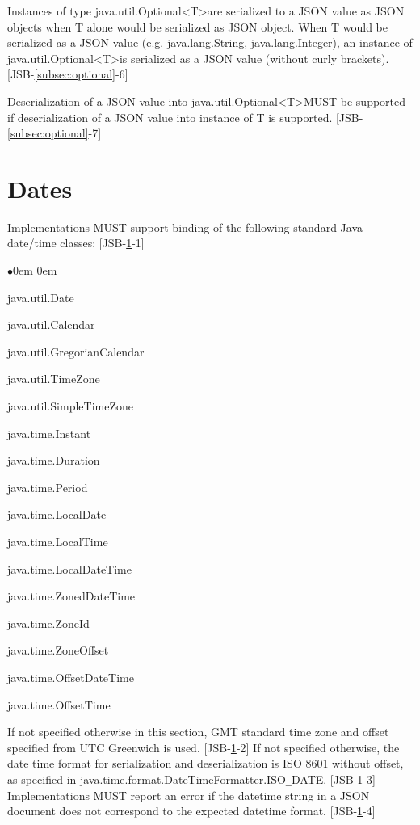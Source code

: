 Instances of type java.util.Optional\textless T\textgreater\space are serialized to a JSON value as JSON objects when T alone would be serialized as JSON object. 
When T would be serialized as a JSON value (e.g. java.lang.String, java.lang.Integer), an instance of java.util.Optional\textless T\textgreater\space is serialized as a JSON value (without curly brackets). [JSB-\ref{subsec:optional}-6]

Deserialization of a JSON value into java.util.Optional\textless T\textgreater\space MUST be supported if deserialization of a JSON value into instance of T is supported. [JSB-\ref{subsec:optional}-7]

\section{Dates}
\label{sec:dates}
Implementations MUST support binding of the following standard Java date/time classes: 
[JSB-\ref{sec:dates}-1]
\begin{list}{$\bullet$}{\parsep 0em  0em}
\item java.util.Date
\item java.util.Calendar
\item java.util.GregorianCalendar
\item java.util.TimeZone
\item java.util.SimpleTimeZone
\item java.time.Instant
\item java.time.Duration
\item java.time.Period
\item java.time.LocalDate
\item java.time.LocalTime
\item java.time.LocalDateTime
\item java.time.ZonedDateTime
\item java.time.ZoneId
\item java.time.ZoneOffset
\item java.time.OffsetDateTime
\item java.time.OffsetTime
\end{list}

If not specified otherwise in this section, GMT standard time zone and offset specified from UTC Greenwich is used. [JSB-\ref{sec:dates}-2]
If not specified otherwise, the date time format for serialization and deserialization is ISO 8601 without offset, as specified in java.time.format.DateTimeFormatter.ISO\verb|_|DATE. [JSB-\ref{sec:dates}-3]
Implementations MUST report an error if the datetime string in a JSON document does not correspond to the expected datetime format. [JSB-\ref{sec:dates}-4]

